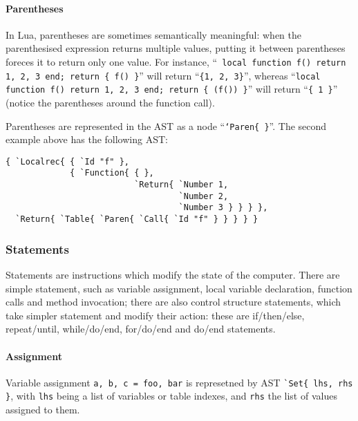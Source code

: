 \paragraph{Parentheses}

In Lua, parentheses are sometimes semantically meaningful: when the
parenthesised expression returns multiple values, putting it between
parentheses foreces it to return only one value. For instance, ``{\tt
  local function f() return 1, 2, 3 end; return \{ f() \}}'' will
return ``{\tt\{1, 2, 3\}}'', whereas ``{\tt local function f() return
  1, 2, 3 end; return \{ (f()) \}}'' will return ``{\tt\{ 1 \}}''
(notice the parentheses around the function call).

Parentheses are represented in the AST as a node ``{\tt`Paren\{
  \}}''. The second example above has the following AST:

\begin{verbatim}
{ `Localrec{ { `Id "f" },  
             { `Function{ { },
                          `Return{ `Number 1,
                                   `Number 2,
                                   `Number 3 } } } },
  `Return{ `Table{ `Paren{ `Call{ `Id "f" } } } } }
\end{verbatim}

\subsubsection{Statements}

Statements are instructions which modify the state of the
computer. There are simple statement, such as variable assignment,
local variable declaration, function calls and method invocation;
there are also control structure statements, which take simpler
statement and modify their action: these are if/then/else,
repeat/until, while/do/end, for/do/end and do/end statements.

\paragraph{Assignment}
Variable assignment \verb+a, b, c = foo, bar+ is represetned by AST
\verb+`Set{ lhs, rhs }+, with {\tt lhs} being a list of variables or
table indexes, and {\tt rhs} the list of values assigned to them.

